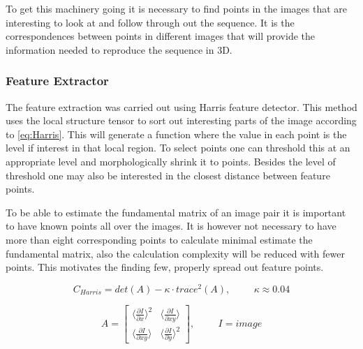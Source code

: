 To get this machinery going it is necessary to find points in the images that are interesting to look at and follow through out the sequence. It is the correspondences between points in different images that will provide the information needed to reproduce the sequence in 3D. 

\subsubsection{Feature Extractor}
The feature extraction was carried out using Harris feature detector. This method uses the local structure tensor to sort out interesting parts of the image according to \eqref{eq:Harris}. This will generate a function where the value in each point is the level if interest in that local region. To select points one can threshold this at an appropriate level and morphologically shrink it to points. Besides the level of threshold one may also be interested in the closest distance between feature points. 

To be able to estimate the fundamental matrix of an image pair it is important to have known points all over the images. It is however not necessary to have more than eight corresponding points to calculate minimal estimate the fundamental matrix, also the calculation complexity will be reduced with fewer points. This motivates the finding few, properly spread out feature points. 

\begin{equation}
\label{eq:Harris}
C_{Harris} = det(A) - \kappa \cdot trace^2(A), \hspace{1cm} \kappa \approx 0.04
\end{equation} 

\begin{equation}
\label{eq:StructureTensor}
A =  \begin{bmatrix}
	   \langle \frac{\partial I}{\partial x} \rangle^2 &  \langle \frac{\partial I}{\partial x y} \rangle \\
	   \langle \frac{\partial I}{\partial x y} \rangle & \langle \frac{\partial I}{\partial y} \rangle^2
	  \end{bmatrix}
	  , \hspace{1cm} I = image
\end{equation}

